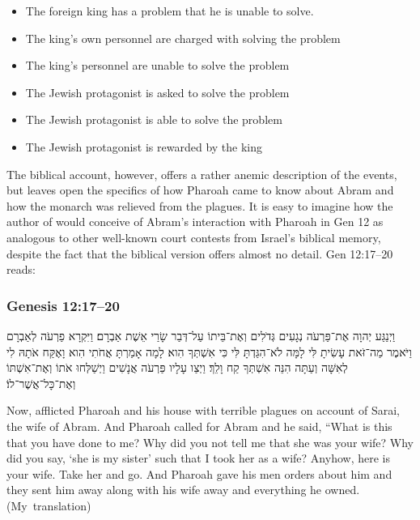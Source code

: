 \begin{SingleSpace}
\begin{itemize}
    \item The foreign king has a problem that he is unable to solve.
    \item The king's own personnel are charged with solving the problem
    \item The king's personnel are unable to solve the problem
    \item The Jewish protagonist is asked to solve the problem
    \item The Jewish protagonist is able to solve the problem
    \item The Jewish protagonist is rewarded by the king
\end{itemize}
\end{SingleSpace}

The biblical account, however, offers a rather anemic description of the events, but leaves open the specifics of how Pharoah came to know about Abram and how the monarch was relieved from the plagues. 
It is easy to imagine how the author of \ga would conceive of Abram's interaction with Pharoah in Gen 12 as analogous to other well-known court contests from Israel's biblical memory, despite the fact that the biblical version offers almost no detail. Gen 12:17--20 reads: 

\subsubsection{Genesis 12:17--20}
\begin{hebrewtranslation}
    ‏וַיְנַגַּע יְהוָה אֶת־פַּרְעֹה נְגָעִים גְּדֹלִים וְאֶת־בֵּיתוֹ עַל־דְּבַר שָׂרַי אֵשֶׁת אַבְרָם׃
    וַיִּקְרָא פַרְעֹה לְאַבְרָם וַיֹּאמֶר מַה־זֹּאת עָשִׂיתָ לִּי לָמָּה לֹא־הִגַּדְתָּ לִּי כִּי אִשְׁתְּךָ הִוא׃
    לָמָה אָמַרְתָּ אֲחֹתִי הִוא וָאֶקַּח אֹתָהּ לִי לְאִשָּׁה וְעַתָּה הִנֵּה אִשְׁתְּךָ קַח וָלֵךְ׃ 
    וַיְצַו עָלָיו פַּרְעֹה אֲנָשִׁים וַיְשַׁלְּחוּ אֹתוֹ וְאֶת־אִשְׁתּוֹ וְאֶת־כָּל־אֲשֶׁר־לוֹ׃
\end{hebrewtranslation}

\begin{translation}
    Now, \yahweh afflicted Pharoah and his house with terrible plagues on account of Sarai, the wife of Abram. 
    And Pharoah called for Abram and he said, ``What is this that you have done to me? Why did you not tell me that she was your wife? 
    Why did you say, `she is my sister' such that I took her as a wife? Anyhow, here is your wife. Take her and go. 
    And Pharoah gave his men orders about him and they sent him away along with his wife away and everything he owned. (My~translation)
\end{translation}

